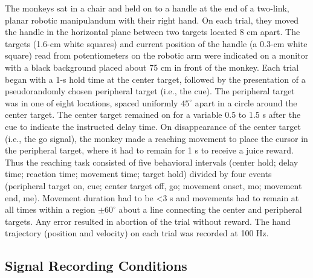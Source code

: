 \documentclass[10 pt]{article}
\begin{document}
The monkeys sat in a chair and held on to a handle at the end of a two-link, planar robotic manipulandum with their right hand. On each trial, they moved the handle in the horizontal plane between two targets located 8 cm apart. The targets (1.6-cm white squares) and current position of the handle (a 0.3-cm white square) read from potentiometers on the robotic arm were indicated on a monitor with a black background placed about 75 cm in front of the monkey.
Each trial began with a 1-s hold time at the center target, followed by the presentation of a pseudorandomly chosen peripheral target (i.e., the cue). The peripheral target was in one of eight locations, spaced uniformly $45^\circ$ apart in a circle around the center target. The center target remained on for a variable 0.5 to 1.5 s after the cue to indicate the instructed delay time. On disappearance of the center target (i.e., the go signal), the monkey made a reaching movement to place the cursor in the peripheral target, where it had to remain for 1 s to receive a juice reward. Thus the reaching task consisted of five behavioral intervals (center hold; delay time; reaction time; movement time; target hold) divided by four events (peripheral target on, cue; center target off, go; movement onset, mo; movement end, me). Movement duration had to be <3 s and movements had to remain at all times within a region $\pm60^\circ$ about a line connecting the center and peripheral targets. Any error resulted in abortion of the trial without reward. The hand trajectory (position and velocity) on each trial was recorded at 100 Hz.

\subsection{Signal Recording Conditions}
\end{document}
